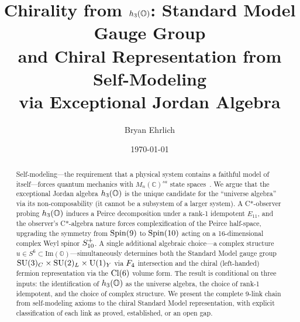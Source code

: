 \documentclass[aps,prd,twocolumn,superscriptaddress,nofootinbib]{revtex4-2}
\begin{document}
\title{Chirality from $h_3(\mathbb{O})$: Standard Model Gauge Group\\
and Chiral Representation from Self-Modeling\\
via Exceptional Jordan Algebra}

\author{Bryan Ehrlich}

\date{\today}

\begin{abstract}
Self-modeling---the requirement that a physical system contains a
faithful model of itself---forces quantum mechanics with
$M_n(\mathbb{C})^{sa}$ state spaces~\cite{Paper5}. We argue that the
exceptional Jordan algebra $h_3(\mathbb{O})$ is the unique candidate for the
``universe algebra'' via its non-composability (it cannot be a subsystem of
a larger system). A C*-observer probing $h_3(\mathbb{O})$ induces a Peirce
decomposition under a rank-1 idempotent $E_{11}$, and the observer's
C*-algebra nature forces complexification of the Peirce half-space,
upgrading the symmetry from $\mathrm{Spin}(9)$ to $\mathrm{Spin}(10)$ acting on a
16-dimensional complex Weyl spinor $S_{10}^+$. A single additional
algebraic choice---a complex structure $u \in S^6 \subset
\mathrm{Im}(\mathbb{O})$---simultaneously determines both the Standard
Model gauge group $\mathrm{SU}(3)_C \times \mathrm{SU}(2)_L \times \mathrm{U}(1)_Y$ via $F_4$ intersection and the chiral
(left-handed) fermion representation via the $\mathrm{Cl}(6)$ volume form. The
result is conditional on three inputs: the identification of $h_3(\mathbb{O})$ as
the universe algebra, the choice of rank-1 idempotent, and the choice of
complex structure. We present the complete 9-link chain from self-modeling
axioms to the chiral Standard Model representation, with explicit
classification of each link as proved, established, or an open gap.
\end{abstract}

\maketitle


%
%
%
%
%

\begin{acknowledgments}
\end{acknowledgments}


\end{document}
